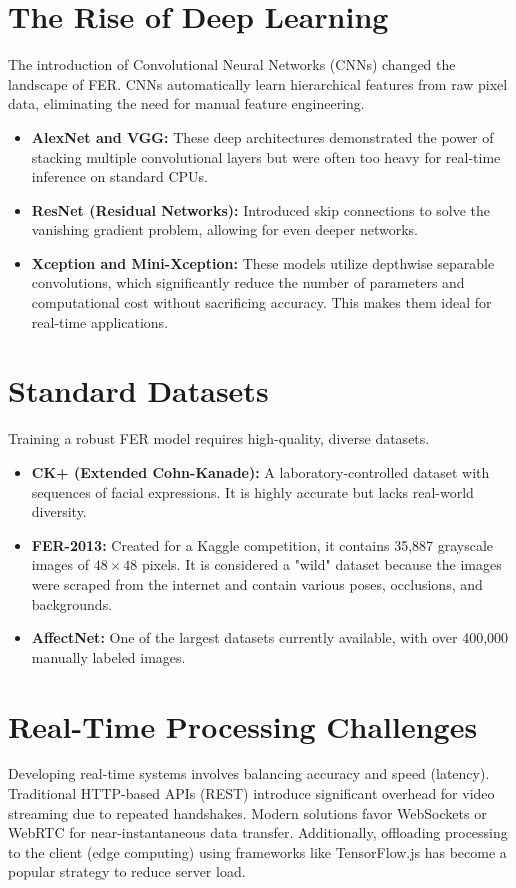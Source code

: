 \documentclass[12pt,a4paper]{report}
\begin{document}
\section{The Rise of Deep Learning}
The introduction of Convolutional Neural Networks (CNNs) changed the landscape of FER. CNNs automatically learn hierarchical features from raw pixel data, eliminating the need for manual feature engineering.
\begin{itemize}
    \item \textbf{AlexNet and VGG:} These deep architectures demonstrated the power of stacking multiple convolutional layers but were often too heavy for real-time inference on standard CPUs.
    \item \textbf{ResNet (Residual Networks):} Introduced skip connections to solve the vanishing gradient problem, allowing for even deeper networks.
    \item \textbf{Xception and Mini-Xception:} These models utilize depthwise separable convolutions, which significantly reduce the number of parameters and computational cost without sacrificing accuracy. This makes them ideal for real-time applications.
\end{itemize}

\section{Standard Datasets}
Training a robust FER model requires high-quality, diverse datasets.
\begin{itemize}
    \item \textbf{CK+ (Extended Cohn-Kanade):} A laboratory-controlled dataset with sequences of facial expressions. It is highly accurate but lacks real-world diversity.
    \item \textbf{FER-2013:} Created for a Kaggle competition, it contains 35,887 grayscale images of $48 \times 48$ pixels. It is considered a "wild" dataset because the images were scraped from the internet and contain various poses, occlusions, and backgrounds.
    \item \textbf{AffectNet:} One of the largest datasets currently available, with over 400,000 manually labeled images.
\end{itemize}

\section{Real-Time Processing Challenges}
Developing real-time systems involves balancing accuracy and speed (latency). Traditional HTTP-based APIs (REST) introduce significant overhead for video streaming due to repeated handshakes. Modern solutions favor WebSockets or WebRTC for near-instantaneous data transfer. Additionally, offloading processing to the client (edge computing) using frameworks like TensorFlow.js has become a popular strategy to reduce server load.
\end{document}

